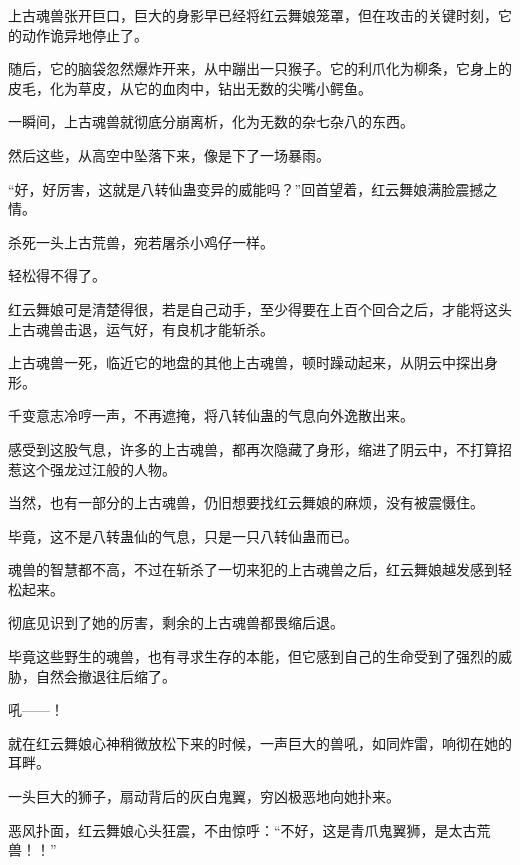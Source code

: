 \begin{this_body}
上古魂兽张开巨口，巨大的身影早已经将红云舞娘笼罩，但在攻击的关键时刻，它的动作诡异地停止了。

随后，它的脑袋忽然爆炸开来，从中蹦出一只猴子。它的利爪化为柳条，它身上的皮毛，化为草皮，从它的血肉中，钻出无数的尖嘴小鳄鱼。

一瞬间，上古魂兽就彻底分崩离析，化为无数的杂七杂八的东西。

然后这些，从高空中坠落下来，像是下了一场暴雨。

“好，好厉害，这就是八转仙蛊变异的威能吗？”回首望着，红云舞娘满脸震撼之情。

杀死一头上古荒兽，宛若屠杀小鸡仔一样。

轻松得不得了。

红云舞娘可是清楚得很，若是自己动手，至少得要在上百个回合之后，才能将这头上古魂兽击退，运气好，有良机才能斩杀。

上古魂兽一死，临近它的地盘的其他上古魂兽，顿时躁动起来，从阴云中探出身形。

千变意志冷哼一声，不再遮掩，将八转仙蛊的气息向外逸散出来。

感受到这股气息，许多的上古魂兽，都再次隐藏了身形，缩进了阴云中，不打算招惹这个强龙过江般的人物。

当然，也有一部分的上古魂兽，仍旧想要找红云舞娘的麻烦，没有被震慑住。

毕竟，这不是八转蛊仙的气息，只是一只八转仙蛊而已。

魂兽的智慧都不高，不过在斩杀了一切来犯的上古魂兽之后，红云舞娘越发感到轻松起来。

彻底见识到了她的厉害，剩余的上古魂兽都畏缩后退。

毕竟这些野生的魂兽，也有寻求生存的本能，但它感到自己的生命受到了强烈的威胁，自然会撤退往后缩了。

吼——！

就在红云舞娘心神稍微放松下来的时候，一声巨大的兽吼，如同炸雷，响彻在她的耳畔。

一头巨大的狮子，扇动背后的灰白鬼翼，穷凶极恶地向她扑来。

恶风扑面，红云舞娘心头狂震，不由惊呼：“不好，这是青爪鬼翼狮，是太古荒兽！！”

\end{this_body}


